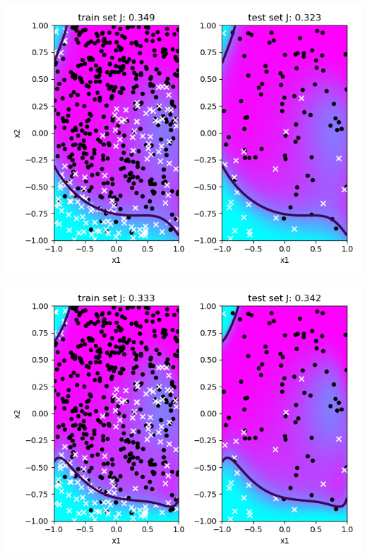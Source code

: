 \documentclass[a4paper]{article}
\begin{document}
\begin{enumerate}
\begin{minipage}[b]{0.4\textwidth}
\end{minipage}
\begin{minipage}[b]{0.4\textwidth}
  \includegraphics[scale=0.35]{plots/gradient_descent_5_1_1000.png}
 \captionsetup{justification=centering}
  \label{gradient_descent_5_1_1000}
\end{minipage}
\hfill
\begin{minipage}[b]{0.4\textwidth}
  \includegraphics[scale=0.35]{plots/gradient_descent_15_1_1000.png}
 \captionsetup{justification=centering}
  \label{gradient_descent_15_1_1000}
\end{minipage}

\end{enumerate}
\end{document}
